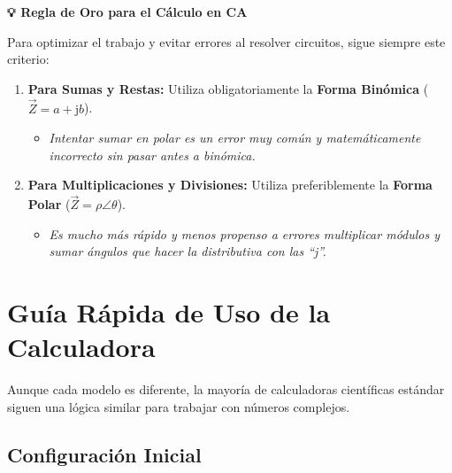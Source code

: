 \documentclass[
  a4paper,
  DIV=11,
  numbers=noendperiod]{scrreprt}
\providecommand{\tightlist}{%
  \setlength{\itemsep}{0pt}\setlength{\parskip}{0pt}}
\begin{document}
\begin{tcolorbox}[enhanced jigsaw, breakable, colback=white, left=2mm, leftrule=.75mm, rightrule=.15mm, toprule=.15mm, colframe=quarto-callout-important-color-frame, arc=.35mm, bottomrule=.15mm, opacityback=0]

\vspace{-3mm}\textbf{💡 Regla de Oro para el Cálculo en CA}\vspace{3mm}

Para optimizar el trabajo y evitar errores al resolver circuitos, sigue
siempre este criterio:

\begin{enumerate}
\def\labelenumi{\arabic{enumi}.}
\tightlist
\item
  \textbf{Para Sumas y Restas:} Utiliza obligatoriamente la
  \textbf{Forma Binómica} (\(\vec{Z} = a + \mathrm{j}b\)).

  \begin{itemize}
  \tightlist
  \item
    \emph{Intentar sumar en polar es un error muy común y
    matemáticamente incorrecto sin pasar antes a binómica.}
  \end{itemize}
\item
  \textbf{Para Multiplicaciones y Divisiones:} Utiliza preferiblemente
  la \textbf{Forma Polar} (\(\vec{Z} = \rho \angle \theta\)).

  \begin{itemize}
  \tightlist
  \item
    \emph{Es mucho más rápido y menos propenso a errores multiplicar
    módulos y sumar ángulos que hacer la distributiva con las ``j''.}
  \end{itemize}
\end{enumerate}

\end{tcolorbox}

\section{Guía Rápida de Uso de la
Calculadora}\label{guuxeda-ruxe1pida-de-uso-de-la-calculadora}

Aunque cada modelo es diferente, la mayoría de calculadoras científicas
estándar siguen una lógica similar para trabajar con números complejos.

\subsection{Configuración Inicial}\label{configuraciuxf3n-inicial}
\end{document}
